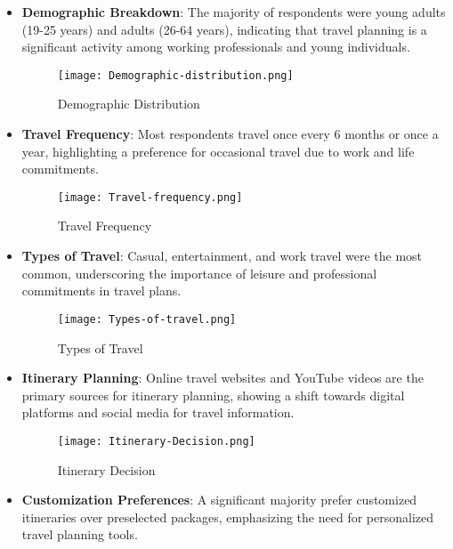 \documentclass[conference]{IEEEtran}
\begin{document}
        \begin{itemize}
            \item \textbf{Demographic Breakdown}: The majority of respondents were young adults (19-25 years) and adults (26-64 years), indicating that travel planning is a significant activity among working professionals and young individuals.
            \begin{figure}
                \centering
                \texttt{[image: Demographic-distribution.png]}
                \caption{Demographic Distribution}
                \label{fig:demographic-distribution}
            \end{figure}
            \item \textbf{Travel Frequency}: Most respondents travel once every 6 months or once a year, highlighting a preference for occasional travel due to work and life commitments.
            \begin{figure}
                \centering
                \texttt{[image: Travel-frequency.png]}
                \caption{Travel Frequency}
                \label{fig:travel-frequency}
            \end{figure}
            \item \textbf{Types of Travel}: Casual, entertainment, and work travel were the most common, underscoring the importance of leisure and professional commitments in travel plans.
            \begin{figure}
                \centering
                \texttt{[image: Types-of-travel.png]}
                \caption{Types of Travel}
                \label{fig:types-of-travel}
            \end{figure}
            \item \textbf{Itinerary Planning}: Online travel websites and YouTube videos are the primary sources for itinerary planning, showing a shift towards digital platforms and social media for travel information.
            \begin{figure}
                \centering
                \texttt{[image: Itinerary-Decision.png]}
                \caption{Itinerary Decision}
                \label{fig:itenary-decision}
            \end{figure}
            \item \textbf{Customization Preferences}: A significant majority prefer customized itineraries over preselected packages, emphasizing the need for personalized travel planning tools.

\end{itemize}
\end{document}
